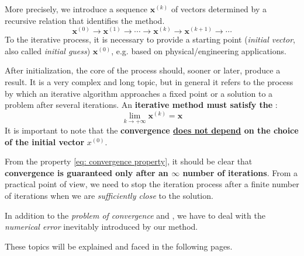 \highspace
More precisely, we introduce a sequence $\mathbf{x}^{\left(k\right)}$ of vectors determined by a recursive relation that identifies the method.
\begin{equation*}
    \mathbf{x}^{\left(0\right)} \rightarrow
    \mathbf{x}^{\left(1\right)} \rightarrow
    \cdots \rightarrow
    \mathbf{x}^{\left(k\right)} \rightarrow
    \mathbf{x}^{\left(k+1\right)} \rightarrow
    \cdots
\end{equation*}
To  the iterative process, it is necessary to provide a starting point (\emph{initial vector}, also called \emph{initial guess}) $\mathbf{x}^{\left(0\right)}$, e.g. based on physical/engineering applications.

\newpage

\noindent
After initialization, the core of the process should, sooner or later, produce a result. It is a very complex and long topic, but in general it refers to the process by which an iterative algorithm approaches a fixed point or a solution to a problem after several iterations. An \textbf{iterative method must satisfy the} :
\begin{equation}\label{eq: convergence property}
    \lim\limits_{k \rightarrow + \infty} \mathbf{x}^{\left(k\right)} = \mathbf{x}
\end{equation}
It is important to note that the \textbf{convergence \underline{does not depend} on the choice of the initial vector} $x^{\left(0\right)}$.

\highspace
From the property \ref{eq: convergence property}, it should be clear that \textbf{convergence is guaranteed only after an $\infty$ number of iterations}. From a practical point of view, we need to stop the iteration process after a finite number of iterations when we are \emph{sufficiently close} to the solution.

\highspace
In addition to the \emph{problem of convergence} and , we have to deal with the \emph{numerical error} inevitably introduced by our method.

\highspace
These topics will be explained and faced in the following pages.